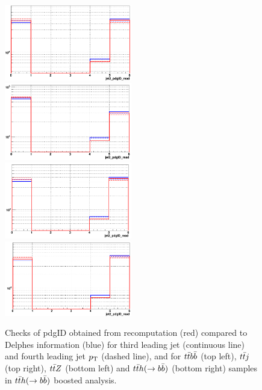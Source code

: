 \documentclass{cernrep}
\begin{document}
\begin{figure}[!htb]\centering
\includegraphics[width=0.495\textwidth]{Fig/Zptt/check_TRF/tth_boosted/jet34pdgID_ttbb_redModule_blueDELPHES.png}
\includegraphics[width=0.495\textwidth]{Fig/Zptt/check_TRF/tth_boosted/jet34pdgID_ttj_redModule_blueDELPHES.png}
\includegraphics[width=0.495\textwidth]{Fig/Zptt/check_TRF/tth_boosted/jet34pdgID_ttz_redModule_blueDELPHES.png}
\includegraphics[width=0.495\textwidth]{Fig/Zptt/check_TRF/tth_boosted/jet34pdgID_tth_redModule_blueDELPHES.png}
\caption{Checks of pdgID obtained from recomputation (red) compared to Delphes information (blue) for third leading jet (continuous line) and fourth leading jet $p\sb{\scriptstyle\mathrm{T}}$ (dashed line), and for $t\bar{t}b\bar{b}$ (top left), $t\bar{t}j$ (top right), $t\bar{t}Z$ (bottom left) and $t\bar{t}h(\rightarrow b\bar{b})$ (bottom right) samples in $t\bar{t}h(\rightarrow b\bar{b})$ boosted analysis.}
\label{fig:tthboosted_TRFchecks2}
\end{figure}
\end{document}
